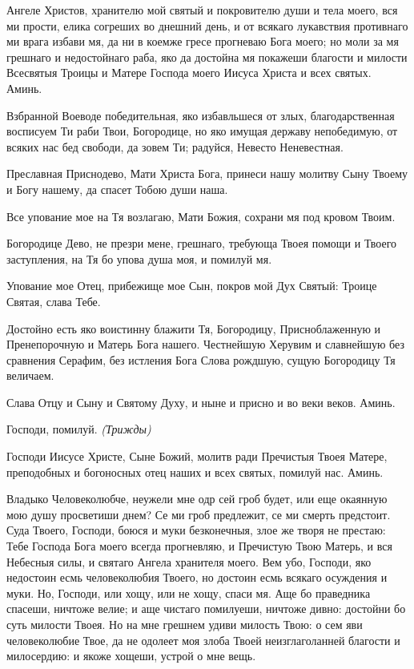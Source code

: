 Ангеле Христов, хранителю мой святый и покровителю души и тела моего, вся ми прости, елика согреших во днешний день, и от всякаго лукавствия противнаго ми врага избави мя, да ни в коемже гресе прогневаю Бога моего; но моли за мя грешнаго и недостойнаго раба, яко да достойна мя покажеши благости и милости Всесвятыя Троицы и Матере Господа моего Иисуса Христа и всех святых. Аминь.




Взбранной Воеводе победительная, яко избавльшеся от злых, благодарственная восписуем Ти раби Твои, Богородице, но яко имущая державу непобедимую, от всяких нас бед свободи, да зовем Ти; радуйся, Невесто Неневестная.


Преславная Приснодево, Мати Христа Бога, принеси нашу молитву Сыну Твоему и Богу нашему, да спасет Тобою души наша.


Все упование мое на Тя возлагаю, Мати Божия, сохрани мя под кровом Твоим.


Богородице Дево, не презри мене, грешнаго, требующа Твоея помощи и Твоего заступления, на Тя бо упова душа моя, и помилуй мя.




Упование мое Отец, прибежище мое Сын, покров мой Дух Святый: Троице Святая, слава Тебе.


Достойно есть яко воистинну блажити Тя, Богородицу, Присноблаженную и Пренепорочную и Матерь Бога нашего. Честнейшую Херувим и славнейшую без сравнения Серафим, без истления Бога Слова рождшую, сущую Богородицу Тя величаем.


Слава Отцу и Сыну и Святому Духу, и ныне и присно и во веки веков. Аминь.

 
Господи, помилуй. \itshape (Трижды)\normalfont{}


Господи Иисусе Христе, Сыне Божий, молитв ради Пречистыя Твоея Матере, преподобных и богоносных отец наших и всех святых, помилуй нас. Аминь.




Владыко Человеколюбче, неужели мне одр сей гроб будет, или еще окаянную мою душу просветиши днем? Се ми гроб предлежит, се ми смерть предстоит. Суда Твоего, Господи, боюся и муки безконечныя, злое же творя не престаю: Тебе Господа Бога моего всегда прогневляю, и Пречистую Твою Матерь, и вся Небесныя силы, и святаго Ангела хранителя моего. Вем убо, Господи, яко недостоин есмь человеколюбия Твоего, но достоин есмь всякаго осуждения и муки. Но, Господи, или хощу, или не хощу, спаси мя. Аще бо праведника спасеши, ничтоже велие; и аще чистаго помилуеши, ничтоже дивно: достойни бо суть милости Твоея. Но на мне грешнем удиви милость Твою: о сем яви человеколюбие Твое, да не одолеет моя злоба Твоей неизглаголанней благости и милосердию: и якоже хощеши, устрой о мне вещь.


